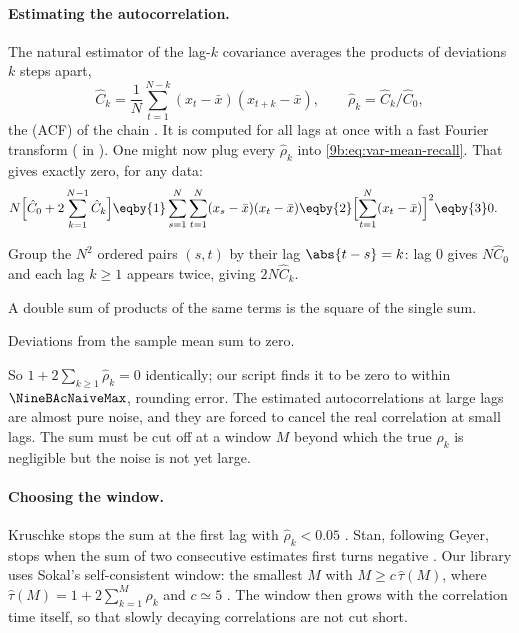 \paragraph{Estimating the autocorrelation.}
The natural estimator of the lag-$k$ covariance averages the products of deviations $k$ steps
apart,
\begin{equation}
  \hat C_k=\frac1N\sum_{t=1}^{N-k}(x_t-\bar x)(x_{t+k}-\bar x),
  \qquad
  \hat\rho_k=\hat C_k/\hat C_0 ,
  \label{9b:eq:acf-hat}
\end{equation}
the  (ACF) of the chain . It is
computed for all lags at once with a fast Fourier transform ( in
). One might now plug every $\hat\rho_k$ into \eqref{9b:eq:var-mean-recall}.
That gives exactly zero, for any data:
\begin{align}
  N\Bigl[\hat C_0+2\sum_{k=1}^{N-1}\hat C_k\Bigr]
  &\eqby{1}\sum_{s=1}^N\sum_{t=1}^N(x_s-\bar x)(x_t-\bar x)
   \eqby{2}\Bigl[\sum_{t=1}^N(x_t-\bar x)\Bigr]^2
   \eqby{3}0 .
  \label{9b:eq:naive-tau}
\end{align}
\begin{explain}
  \item Group the $N^2$ ordered pairs $(s,t)$ by their lag $\abs{t-s}=k$: lag 0 gives $N\hat
        C_0$ and each lag $k\ge1$ appears twice, giving $2N\hat C_k$.
  \item A double sum of products of the same terms is the square of the single sum.
  \item Deviations from the sample mean sum to zero.
\end{explain}
So $1+2\sum_{k\ge1}\hat\rho_k=0$ identically; our script finds it to be zero to within
$\NineBAcNaiveMax$, rounding error. The estimated autocorrelations at large lags are almost pure
noise, and they are forced to cancel the real correlation at small lags. The sum must be cut off
at a window $M$ beyond which the true $\rho_k$ is negligible but the noise is not yet large.

\paragraph{Choosing the window.}
Kruschke stops the sum at the first lag with $\hat\rho_k<0.05$ .
Stan, following Geyer, stops when the sum of two consecutive estimates first turns negative
. Our library uses Sokal's self-consistent window: the smallest $M$ with
$M\ge c\,\hat\tau(M)$, where $\hat\tau(M)=1+2\sum_{k=1}^M\hat\rho_k$ and $c\simeq5$
\parencite{Sokal1997}. The window then grows with the correlation time itself, so that slowly
decaying correlations are not cut short.

